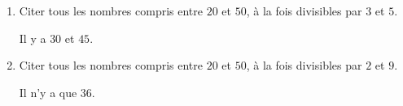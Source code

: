     \begin{enumerate}
        \item Citer tous les nombres compris entre $20$ et $50$, à la fois divisibles par $3$ et $5$.

        Il y a $30$ et $45$.
        \item Citer tous les nombres compris entre $20$ et $50$, à la fois divisibles par $2$ et $9$.

        Il n'y a que $36$.
    \end{enumerate}
